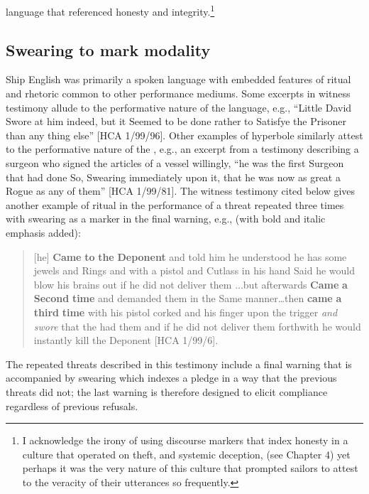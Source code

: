 language that referenced honesty and integrity.\footnote{I acknowledge the irony of using discourse markers that index honesty in a culture that operated on theft,  and systemic deception, (see Chapter 4) yet perhaps it was the very nature of this culture that prompted sailors to attest to the veracity of their utterances so frequently.} 

\subsection{{Swearing to mark modality}}%

Ship English was primarily a spoken language with embedded features of ritual and rhetoric common to other performance mediums. Some excerpts in witness testimony allude to the performative nature of the language, e.g., “Little David Swore at him indeed, but it Seemed to be done rather to Satisfye the Prisoner than any thing else” [HCA 1/99/96]. Other examples of hyperbole similarly attest to the performative nature of the , e.g., an excerpt from a testimony describing a surgeon who signed the articles of a  vessel willingly, “he was the first Surgeon that had done So, Swearing immediately upon it, that he was now as great a Rogue as any of them” [HCA 1/99/81]. The witness testimony cited below gives another example of ritual in the performance of a threat repeated three times with swearing as a marker in the final warning, e.g., (with bold and italic emphasis added):

\begin{quotation}
[he] \textbf{Came} \textbf{to} \textbf{the} \textbf{Deponent} and told him he understood he has some jewels and Rings and with a pistol and Cutlass in his hand Said he would blow his brains out if he did not deliver them ...but afterwards \textbf{Came} \textbf{a} \textbf{Second} \textbf{time} and demanded them in the Same manner…then \textbf{came} \textbf{a} \textbf{third} \textbf{time} with his pistol corked and his finger upon the trigger \textit{and swore} that the  had them and if he did not deliver them forthwith he would instantly kill the Deponent [HCA 1/99/6]. 
\end{quotation}

The repeated threats described in this testimony include a final warning that is accompanied by swearing which indexes a pledge in a way that the previous threats did not; the last warning is therefore designed to elicit compliance regardless of previous refusals. 

